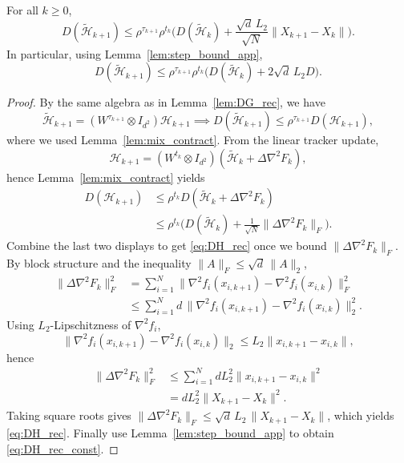 \documentclass[review,onefignum,onetabnum]{siamart171218}
\begin{document}
	\begin{lemma}\label{lem:DH_rec}
		For all $k\ge0$,
		\begin{equation}\label{eq:DH_rec}
			D(\tilde{\mathcal H}_{k+1})
			\le \rho^{\tau_{k+1}}\rho^{t_k}\Big(D(\tilde{\mathcal H}_k)+\frac{\sqrt d\,L_2}{\sqrt N}\|X_{k+1}-X_k\|\Big).
		\end{equation}
		In particular, using Lemma~\ref{lem:step_bound_app},
		\begin{equation}\label{eq:DH_rec_const}
			D(\tilde{\mathcal H}_{k+1})
			\le \rho^{\tau_{k+1}}\rho^{t_k}\Big(D(\tilde{\mathcal H}_k)+2\sqrt d\,L_2D\Big).
		\end{equation}
	\end{lemma}
	\begin{proof}
		By the same algebra as in Lemma~\ref{lem:DG_rec}, we have
		\[
		\tilde{\mathcal H}_{k+1} = (W^{\tau_{k+1}}\!\otimes\! I_{d^2})\mathcal H_{k+1} \implies
		D(\tilde{\mathcal H}_{k+1}) \le \rho^{\tau_{k+1}} D(\mathcal H_{k+1}),
		\]
		where we used Lemma~\ref{lem:mix_contract}. From the linear tracker update,
		\[
		\mathcal H_{k+1} = (W^{t_k}\!\otimes\! I_{d^2})(\tilde{\mathcal H}_k\!+\!\Delta\nabla^2 F_k),
		\]
		hence Lemma~\ref{lem:mix_contract} yields
		\begin{align*}
			D(\mathcal H_{k+1})
			&\le \rho^{t_k}D(\tilde{\mathcal H}_k\!+\!\Delta\nabla^2 F_k)\\
			&\le \rho^{t_k}\!\Big(D(\tilde{\mathcal H}_k)\!+\!\tfrac1{\sqrt N}\|\Delta\nabla^2 F_k\|_F\Big).
		\end{align*}
		Combine the last two displays to get \eqref{eq:DH_rec} once we bound $\|\Delta\nabla^2F_k\|_F$.
		By block structure and the inequality $\|A\|_F\le \sqrt d\,\|A\|_2$,
		\begin{align*}
			\|\Delta\nabla^2 F_k\|_F^2
			&=\textstyle\sum_{i=1}^N\|\nabla^2 f_i(x_{i,k+1})\!-\!\nabla^2 f_i(x_{i,k})\|_F^2\\
			&\le \textstyle\sum_{i=1}^N d\,\|\nabla^2 f_i(x_{i,k+1})\!-\!\nabla^2 f_i(x_{i,k})\|_2^2.
		\end{align*}
		Using $L_2$-Lipschitzness of $\nabla^2 f_i$,
		\[
		\|\nabla^2 f_i(x_{i,k+1})\!-\!\nabla^2 f_i(x_{i,k})\|_2\le L_2\|x_{i,k+1}\!-\!x_{i,k}\|,
		\]
		hence
		\begin{align*}
			\|\Delta\nabla^2 F_k\|_F^2
			&\le \textstyle\sum_{i=1}^N d L_2^2\|x_{i,k+1}\!-\!x_{i,k}\|^2\\
			&= dL_2^2\|X_{k+1}\!-\!X_k\|^2.
		\end{align*}
		Taking square roots gives $\|\Delta\nabla^2 F_k\|_F\le \sqrt d\,L_2\,\|X_{k+1}-X_k\|$,
		which yields \eqref{eq:DH_rec}. Finally use Lemma~\ref{lem:step_bound_app} to obtain \eqref{eq:DH_rec_const}.
	\end{proof}
	
\end{document}
